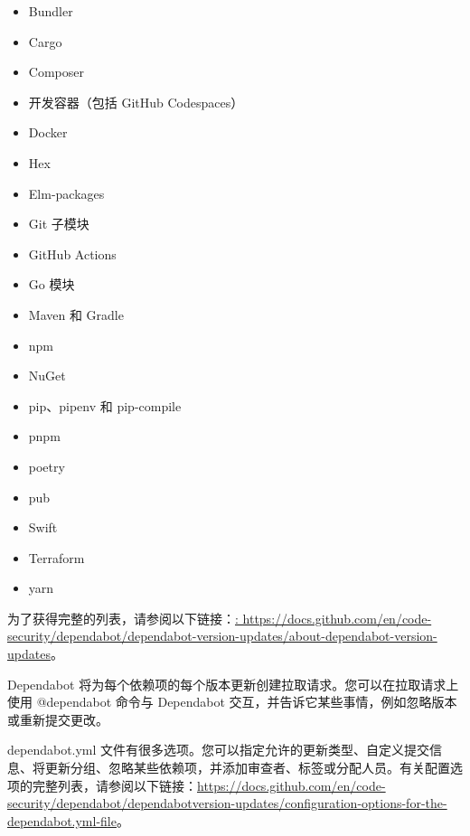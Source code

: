 \begin{itemize}
\item 
Bundler

\item 
Cargo

\item 
Composer

\item 
开发容器（包括 GitHub Codespaces）

\item 
Docker

\item 
Hex

\item 
Elm-packages

\item 
Git 子模块

\item 
GitHub Actions

\item 
Go 模块

\item 
Maven 和 Gradle

\item 
npm

\item 
NuGet

\item 
pip、pipenv 和 pip-compile

\item 
pnpm

\item 
poetry

\item 
pub

\item 
Swift

\item 
Terraform

\item 
yarn
\end{itemize}

为了获得完整的列表，请参阅以下链接：\url{: https://docs.github.com/en/code-security/dependabot/dependabot-version-updates/about-dependabot-version-updates}。

Dependabot 将为每个依赖项的每个版本更新创建拉取请求。您可以在拉取请求上使用 @dependabot 命令与 Dependabot 交互，并告诉它某些事情，例如忽略版本或重新提交更改。

dependabot.yml 文件有很多选项。您可以指定允许的更新类型、自定义提交信息、将更新分组、忽略某些依赖项，并添加审查者、标签或分配人员。有关配置选项的完整列表，请参阅以下链接：\url{https://docs.github.com/en/code-security/dependabot/dependabotversion-updates/configuration-options-for-the-dependabot.yml-file}。

